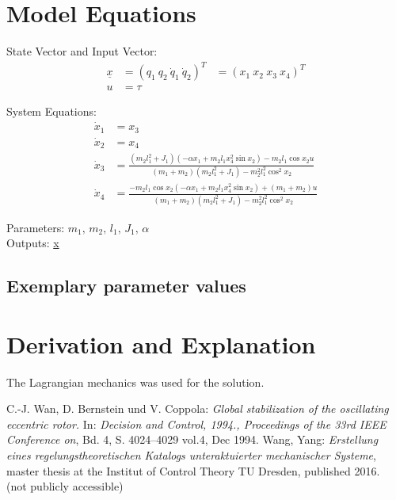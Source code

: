 \documentclass[10pt,a4paper]{article}
\begin{document}
	
	\section{Model Equations} %
	
	State Vector and Input Vector:
	\begin{align*}
		\underline{x} &= (q_1 \ q_2 \ \dot{q}_1 \ \dot{q}_2)^T &= (x_1 \ x_2 \ x_3 \ x_4)^T \\
		u &= \tau 
	\end{align*}
	
	\noindent System Equations:			
	\begin{subequations}
	\begin{align}
		\dot{x}_1 &= x_3 \\
		\dot{x}_2 &= x_4 \\
		\dot{x}_3 &= \frac{(m_2l_1^2 + J_1)(-\alpha x_1 + m_2l_1x_4^2 \sin x_2) - m_2l_1 \cos x_2 u}{(m_1 + m_2)(m_2l_1^2 + J_1) - m_2^2l_1^2 \cos^2 x_2} \\
		\dot{x}_4 &= \frac{-m_2l_1 \cos x_2(-\alpha x_1 + m_2l_1x_4^2 \sin x_2) + (m_1 + m_2)u}{(m_1 + m_2)(m_2l_1^2 + J_1) - m_2^2l_1^2 \cos^2 x_2}		
	\end{align}
	\end{subequations}

	\noindent
	Parameters: $m_1, \, m_2, \, l_1, \, J_1, \, \alpha$ %
	\\
	Outputs: \underline{x}
	
	
	\subsection{Exemplary parameter values}
	

	
	\section{Derivation and Explanation} %
	
	The Lagrangian mechanics was used for the solution.
	
	
	\begin{thebibliography}{10}		
		C.-J. Wan, D. Bernstein und V. Coppola: 
		\textit{Global stabilization of the oscillating
eccentric rotor.} In: \textit{Decision and Control, 1994., Proceedings of the 33rd IEEE
Conference on}, Bd. 4, S. 4024–4029 vol.4, Dec 1994.
		Wang, Yang:  
		\textit{Erstellung eines regelungstheoretischen Katalogs unteraktuierter mechanischer Systeme}, master thesis at the Institut of Control Theory TU Dresden, published 2016. \\
		(not publicly accessible)
	\end{thebibliography}
\end{document}

